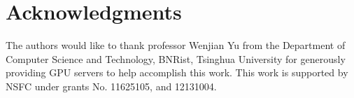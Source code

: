 \section*{Acknowledgments}

The authors would like to thank professor Wenjian Yu from the Department of Computer Science and Technology, BNRist, Tsinghua University for generously providing GPU servers to help accomplish this work. This work is supported by NSFC under grants No. 11625105, and 12131004.

